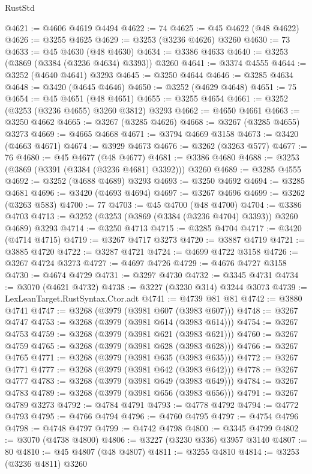 \begin{lexlean}{RustStd}
\begin{coremodule}
@4621 := @4606 @4619 @4494
@4622 := 74
@4625 := @45 @4622 (@48 @4622)
@4626 := @3255 @4625
@4629 := @3253 (@3236 @4626) @3260
@4630 := 73
@4633 := @45 @4630 (@48 @4630)
@4634 := @3386 @4633
@4640 := @3253 (@3869 (@3384 (@3236 @4634) @3393)) @3260
@4641 := @3374 @4555
@4644 := @3252 (@4640 @4641) @3293
@4645 := @3250 @4644
@4646 := @3285 @4634
@4648 := @3420 (@4645 @4646)
@4650 := @3252 (@4629 @4648)
@4651 := 75
@4654 := @45 @4651 (@48 @4651)
@4655 := @3255 @4654
@4661 := @3252 (@3253 (@3236 @4655) @3260 @3812) @3293
@4662 := @4650 @4661
@4663 := @3250 @4662
@4665 := @3267 (@3285 @4626)
@4668 := @3267 (@3285 @4655) @3273
@4669 := @4665 @4668
@4671 := @3794 @4669 @3158
@4673 := @3420 (@4663 @4671)
@4674 := @3929 @4673
@4676 := @3262 (@3263 @577)
@4677 := 76
@4680 := @45 @4677 (@48 @4677)
@4681 := @3386 @4680
@4688 := @3253 (@3869 (@3391 (@3384 (@3236 @4681) @3392))) @3260
@4689 := @3285 @4555
@4692 := @3252 (@4688 @4689) @3293
@4693 := @3250 @4692
@4694 := @3285 @4681
@4696 := @3420 (@4693 @4694)
@4697 := @3267 @4696
@4699 := @3262 (@3263 @583)
@4700 := 77
@4703 := @45 @4700 (@48 @4700)
@4704 := @3386 @4703
@4713 := @3252 (@3253 (@3869 (@3384 (@3236 @4704) @3393)) @3260 @4689) @3293
@4714 := @3250 @4713
@4715 := @3285 @4704
@4717 := @3420 (@4714 @4715)
@4719 := @3267 @4717 @3273
@4720 := @3887 @4719
@4721 := @3885 @4720
@4722 := @3287 @4721
@4724 := @4699 @4722 @3158
@4726 := @3267 @4724 @3273
@4727 := @4697 @4726
@4729 := @4676 @4727 @3158
@4730 := @4674 @4729
@4731 := @3297 @4730
@4732 := @3345 @4731
@4734 := @3070 (@4621 @4732)
@4738 := @3227 (@3230 @314) @3244 @3073
@4739 := LexLeanTarget.RustSyntax.Ctor.adt
@4741 := @4739 @81 @81
@4742 := @3880 @4741
@4747 := @3268 (@3979 (@3981 @607 (@3983 @607)))
@4748 := @3267 @4747
@4753 := @3268 (@3979 (@3981 @614 (@3983 @614)))
@4754 := @3267 @4753
@4759 := @3268 (@3979 (@3981 @621 (@3983 @621)))
@4760 := @3267 @4759
@4765 := @3268 (@3979 (@3981 @628 (@3983 @628)))
@4766 := @3267 @4765
@4771 := @3268 (@3979 (@3981 @635 (@3983 @635)))
@4772 := @3267 @4771
@4777 := @3268 (@3979 (@3981 @642 (@3983 @642)))
@4778 := @3267 @4777
@4783 := @3268 (@3979 (@3981 @649 (@3983 @649)))
@4784 := @3267 @4783
@4789 := @3268 (@3979 (@3981 @656 (@3983 @656)))
@4791 := @3267 @4789 @3273
@4792 := @4784 @4791
@4793 := @4778 @4792
@4794 := @4772 @4793
@4795 := @4766 @4794
@4796 := @4760 @4795
@4797 := @4754 @4796
@4798 := @4748 @4797
@4799 := @4742 @4798
@4800 := @3345 @4799
@4802 := @3070 (@4738 @4800)
@4806 := @3227 (@3230 @336) @3957 @3140
@4807 := 80
@4810 := @45 @4807 (@48 @4807)
@4811 := @3255 @4810
@4814 := @3253 (@3236 @4811) @3260

\end{coremodule}
\end{lexlean}
